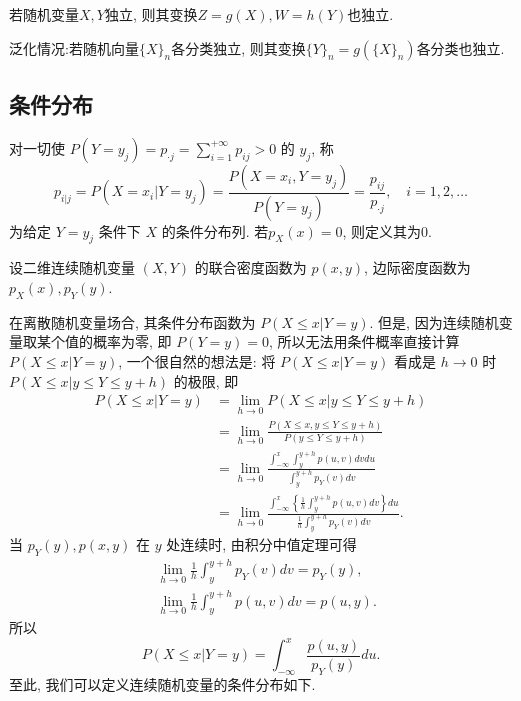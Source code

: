 \begin{theorem}
    若随机变量$X,Y$独立, 则其变换$Z=g(X), W=h(Y)$也独立.

    泛化情况:若随机向量$\{X\}_n$各分类独立, 则其变换$\{Y\}_n=g(\{X\}_n)$各分类也独立.
\end{theorem}

\subsection{条件分布}

\begin{definition}
    对一切使 $P\left(Y=y_{j}\right)=p_{ \cdot j}=\sum_{i=1}^{+\infty} p_{i j}>0$ 的 $y_j$, 称
    \begin{equation}\label{eq:3.5.1}
        p_{i | j}=P\left(X=x_{i} | Y=y_{j}\right)=\frac{P\left(X=x_{i}, Y=y_{j}\right)}{P\left(Y=y_{j}\right)}
        =\frac{p_{i j}}{p_{\cdot j}}, \quad i=1,2, \ldots
    \end{equation}
    为给定 $Y=y_j$ 条件下 $X$ 的条件分布列. 若$p_X(x)=0$, 则定义其为0.
\end{definition}

设二维连续随机变量 $(X,Y)$ 的联合密度函数为 $p(x,y)$, 边际密度函数为 $p_X(x),p_Y(y)$.

在离散随机变量场合, 其条件分布函数为 $P(X\leq x|Y=y)$. 但是, 因为连续随机变量取某个值的概率为零, 即 $P(Y=y)=0$, 所以无法用条件概率直接计算 $P(X\leq x|Y=y)$, 一个很自然的想法是: 将 $P(X\leq x|Y=y)$ 看成是 $h\to 0$ 时 $P(X\leq x|y\leq Y\leq y+h)$ 的极限, 即
\begin{align*}
    P(X \leq  x | Y=y) & =\lim _{h \to 0} P(X \leq  x | y \leq  Y \leq  y+h)                                                  \\
                       & =\lim _{h \to 0} \frac{P(X \leq  x, y \leq  Y \leq  y+h)}{P(y \leq  Y \leq  y+h)}                    \\
                       & =\lim _{h \to 0} \frac{\int_{-\infty}^{x} \int_{y}^{y+h} p(u, v) dv du}{\int_{y}^{y+h} p_{Y}(v) dv}  \\
                       & =\lim _{h \to 0} \frac{\int_{-\infty}^{x} \left\{ \frac{1}{h} \int_{y}^{y+h} p(u, v) dv \right\} du}
    {\frac{1}{h} \int_{y}^{y+h} p_{Y}(v) dv}.
\end{align*}
当 $p_Y(y),p(x,y)$ 在 $y$ 处连续时, 由积分中值定理可得
\begin{align*}
     & \lim _{h \to 0} \frac{1}{h} \int_{y}^{y+h} p_{Y}(v) dv=p_{Y}(y), \\
     & \lim _{h \to 0} \frac{1}{h} \int_{y}^{y+h} p(u, v) dv=p(u, y).
\end{align*}
所以
\[
    P(X \leq x | Y=y)=\int_{-\infty}^{x} \frac{p(u, y)}{p_{Y}(y)} du.
\]
至此, 我们可以定义连续随机变量的条件分布如下.

